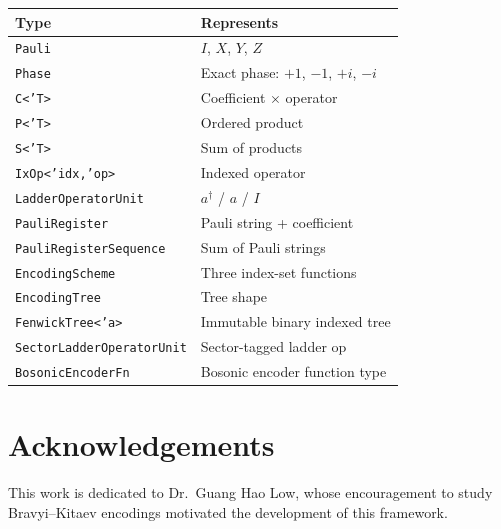 \documentclass[10pt,a4paper]{article}
\begin{document}
\begin{center}
\small
\begin{tabular}{ll}
\toprule
\textbf{Type} & \textbf{Represents} \\
\midrule
\texttt{Pauli} & $I$, $X$, $Y$, $Z$ \\
\texttt{Phase} & Exact phase: $+1$, $-1$, $+i$, $-i$ \\
\texttt{C<'T>} & Coefficient $\times$ operator \\
\texttt{P<'T>} & Ordered product \\
\texttt{S<'T>} & Sum of products \\
\texttt{IxOp<'idx,'op>} & Indexed operator \\
\texttt{LadderOperatorUnit} & $a^\dagger$ / $a$ / $I$ \\
\texttt{PauliRegister} & Pauli string + coefficient \\
\texttt{PauliRegisterSequence} & Sum of Pauli strings \\
\texttt{EncodingScheme} & Three index-set functions \\
\texttt{EncodingTree} & Tree shape \\
\texttt{FenwickTree<'a>} & Immutable binary indexed tree \\
\texttt{SectorLadderOperatorUnit} & Sector-tagged ladder op \\
\texttt{BosonicEncoderFn} & Bosonic encoder function type \\
\bottomrule
\end{tabular}
\end{center}


\section*{Acknowledgements}

This work is dedicated to Dr.\ Guang Hao Low, whose encouragement to
study Bravyi--Kitaev encodings motivated the development of this
framework.


\end{document}
